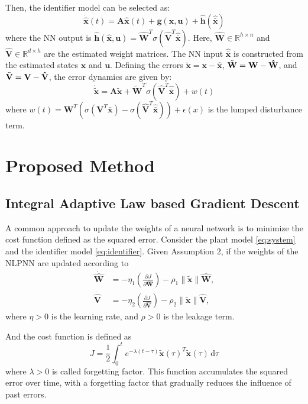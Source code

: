 \documentclass[10pt,twocolumn]{ICCAS}
\newcommand{\ud}{\,\mathrm{d}}
\newcommand{\R}{\mathbb{R}}
\newcommand{\xtilde}{\tilde{\bm{x}}}
\newcommand{\xhat}{\hat{\bm{x}}}
\newcommand{\xbar}{\bar{\bm{x}}}
\newcommand{\xhatbar}{\hat{\bar{\bm{x}}}}
\newcommand{\Wtilde}{\tilde{\mathbf{W}}}
\newcommand{\What}{\hat{\mathbf{W}}}
\newcommand{\Vtilde}{\tilde{\mathbf{V}}}
\newcommand{\Vhat}{\hat{\mathbf{V}}}
\begin{document}
Then, the identifier model can be selected as:
\begin{equation}
    \dot{\xhat}(t) = {\mathbf{A}}\bm{\xhat}(t) + \bm{g}(\bm{x}, \bm{u}) + \bm{\hat{h}}(\xhatbar)
    \label{eq:identifier}
\end{equation}
where the NN output is $\bm{\hat{h}}(\bm{\hat{x}},\bm{u}) = \What^T \sigma(\Vhat^T \xhatbar)$. Here, $\What \in \R^{h \times n}$ and $\Vhat \in \R^{d \times h}$ are the estimated weight matrices. The NN input $\xhatbar$ is constructed from the estimated states $\xhat$ and $\bm{u}$.
Defining the errors $\xtilde = \bm{x} - \xhat$, $\Wtilde = \bf{W} - \What$, and $\Vtilde = \bf{V} - \Vhat$, the error dynamics are given by:
\begin{equation}
    \dot{\xtilde} = {\mathbf{A}}\bm{\xtilde} + {\Wtilde}^{T} \sigma(\Vhat^T \bm{\xhatbar}) + w(t)
    \label{eq:error_dyn_final}
\end{equation}
where $w(t) = {\mathbf{W}}^T\left(\sigma({\mathbf{V}}^T\bm{\xbar}) - \sigma(\Vhat^T\xhatbar)\right) + \epsilon(x)$ is the lumped disturbance term.








\section{Proposed Method}

\subsection{Integral Adaptive Law based Gradient Descent}
A common approach to update the weights of a neural network is to minimize the cost function defined as the squared error. Consider the plant model \eqref{eq:system} and the identifier model \eqref{eq:identifier}. Given Assumption 2, if the weights of the NLPNN are updated according to
\begin{align}
    \dot{\mathbf{\What}} &= -\eta_1\left(\frac{\partial J}{\partial \hat{\mathbf{W}}}\right) - \rho_1\|\tilde{\bm{x}}\|\hat{\mathbf{W}},\\
    \dot{\mathbf{\Vhat}} &= -\eta_2\left(\frac{\partial J}{\partial \hat{\mathbf{V}}}\right) - \rho_2\|\tilde{\bm{x}}\|\hat{\mathbf{V}},
\end{align}
where $\eta > 0$ is the learning rate, and $\rho > 0$ is the leakage term.

And the cost function is defined as
\begin{equation}
J = \frac{1}{2} \int_{0}^{t} e^{-\lambda(t-\tau)} {\xtilde(\tau)}^T \xtilde(\tau) \ud\tau 
\end{equation} 
where $\lambda > 0$ is called forgetting factor. This function accumulates the squared error over time, with a forgetting factor that gradually reduces the influence of past errors.
\end{document}
